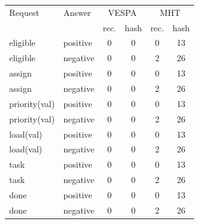 \begin{tabular}{llcccc}
\toprule
Request & Answer & \multicolumn{2}{c}{VESPA} & \multicolumn{2}{c}{MHT}\\
 & & rec. & hash & rec. & hash\\
\midrule
eligible & positive & 0 & 0 & 0 & 13\\
eligible & negative & 0 & 0 & 2 & 26\\
assign & positive & 0 & 0 & 0 & 13\\
assign & negative & 0 & 0 & 2 & 26\\
priority(val) & positive & 0 & 0 & 0 & 13\\
priority(val) & negative & 0 & 0 & 2 & 26\\
load(val) & positive & 0 & 0 & 0 & 13\\
load(val) & negative & 0 & 0 & 2 & 26\\
task & positive & 0 & 0 & 0 & 13\\
task & negative & 0 & 0 & 2 & 26\\
done & positive & 0 & 0 & 0 & 13\\
done & negative & 0 & 0 & 2 & 26\\
\bottomrule
\end{tabular}